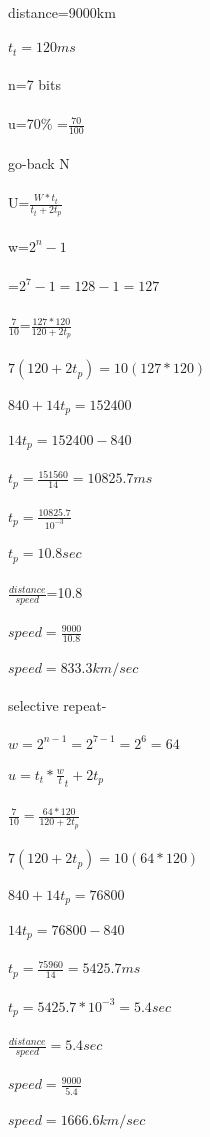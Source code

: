 \documentclass[a4paper,12pt]{article}
\begin{document}
distance=9000km\\\\
$t_{t}=120ms$\\\\
n=7 bits\\\\
u=70\%  =$\frac{70}{100}$\\\\
go-back N\\\\
U=$\frac{W*t_{t}}{t_{t}+2t_{p}}$\\\\
w=$2^{n}-1$\\\\
=$2^{7}-1  =128-1=127$\\\\
$\frac{7}{10}$=$\frac{127*120}{120+2t_{p}}$\\\\
$7(120+2t_{p})=10(127*120)$\\\\
$840+14t_{p}=152400$\\\\
$14t_{p}=152400-840$\\\\
$t_{p}=\frac{151560}{14}=10825.7 ms$\\\\
$t_{p}=\frac{10825.7}{10^{-3}}$\\\\
$t_{p}=10.8 sec$\\\\
$\frac{distance}{speed}$=10.8\\\\
$speed=\frac{9000}{10.8}$\\\\
$speed=833.3 km/sec$\\\\
selective repeat-\\\\
$w=2^{n-1}=2^{7-1}=2^{6}=64$\\\\
$u=t_{t}*\frac{w}{t}_{t}+2t_{p}$\\\\
$\frac{7}{10}=\frac{64*120}{120+2t_{p}}$\\\\
$7(120+2t_{p})=10(64*120)$\\\\
$840+14t_{p}=76800$\\\\
$14t_{p}=76800-840$\\\\
$t_{p}=\frac{75960}{14} =5425.7 ms$\\\\
$t_{p}=5425.7*10^{-3}=5.4 sec$\\\\
$\frac{distance}{speed}=5.4 sec$\\\\
$speed=\frac{9000}{5.4}$\\\\
$speed=1666.6 km/sec$\\\\
\end{document}

